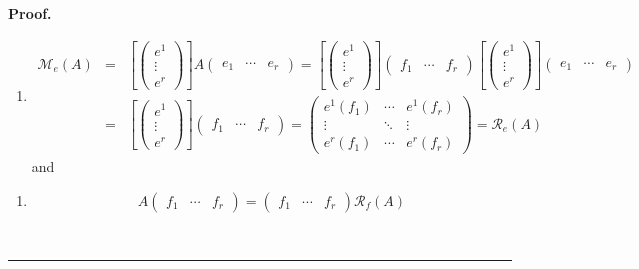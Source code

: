\documentclass[aps,preprint]{revtex4}
\newenvironment{proof}[1][Proof]{\noindent\textbf{#1.} }{\ \rule{0.5em}{0.5em}}
\begin{document}
\begin{proof}
\begin{enumerate}
\begin{enumerate}
\item 
\begin{eqnarray}
\mathcal{M}_{e}\left( A\right) &=&\left[ \left( 
\begin{array}{c}
e^{1} \\ 
\vdots \\ 
e^{r}%
\end{array}%
\right) \right] A\left( 
\begin{array}{ccc}
e_{1} & \cdots & e_{r}%
\end{array}%
\right) =\left[ \left( 
\begin{array}{c}
e^{1} \\ 
\vdots \\ 
e^{r}%
\end{array}%
\right) \right] \left( 
\begin{array}{ccc}
f_{1} & \cdots & f_{r}%
\end{array}%
\right) \left[ \left( 
\begin{array}{c}
e^{1} \\ 
\vdots \\ 
e^{r}%
\end{array}%
\right) \right] \left( 
\begin{array}{ccc}
e_{1} & \cdots & e_{r}%
\end{array}%
\right) \\
&=&\left[ \left( 
\begin{array}{c}
e^{1} \\ 
\vdots \\ 
e^{r}%
\end{array}%
\right) \right] \left( 
\begin{array}{ccc}
f_{1} & \cdots & f_{r}%
\end{array}%
\right) =\left( 
\begin{array}{ccc}
e^{1}\left( f_{1}\right) & \cdots & e^{1}\left( f_{r}\right) \\ 
\vdots & \ddots & \vdots \\ 
e^{r}\left( f_{1}\right) & \cdots & e^{r}\left( f_{r}\right)%
\end{array}%
\right) =\mathcal{R}_{e}\left( A\right)
\end{eqnarray}%
and
\end{enumerate}

\begin{enumerate}
\item 
\begin{equation}
A\left( 
\begin{array}{ccc}
f_{1} & \cdots & f_{r}%
\end{array}%
\right) =\left( 
\begin{array}{ccc}
f_{1} & \cdots & f_{r}%
\end{array}%
\right) \mathcal{R}_{f}\left( A\right)
\end{equation}


\end{enumerate}
\end{enumerate}
\end{proof}
\end{document}
